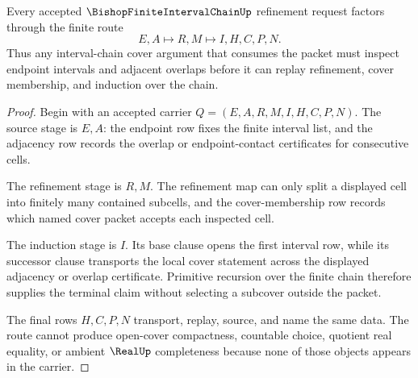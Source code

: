 \begin{theorem}
\label{thm:bishop-finite-interval-chain-refinement-induction}
Every accepted $\BishopFiniteIntervalChainUp$ refinement request factors through the finite route
$$
E,A \longmapsto R,M \longmapsto I,H,C,P,N .
$$
Thus any interval-chain cover argument that consumes the packet must inspect endpoint intervals and adjacent overlaps before it can replay refinement, cover membership, and induction over the chain.
\end{theorem}
\begin{proof}
Begin with an accepted carrier $Q=(E,A,R,M,I,H,C,P,N)$. The source stage is $E,A$: the endpoint row fixes the finite interval list, and the adjacency row records the overlap or endpoint-contact certificates for consecutive cells.

The refinement stage is $R,M$. The refinement map can only split a displayed cell into finitely many contained subcells, and the cover-membership row records which named cover packet accepts each inspected cell.

The induction stage is $I$. Its base clause opens the first interval row, while its successor clause transports the local cover statement across the displayed adjacency or overlap certificate. Primitive recursion over the finite chain therefore supplies the terminal claim without selecting a subcover outside the packet.

The final rows $H,C,P,N$ transport, replay, source, and name the same data. The route cannot produce open-cover compactness, countable choice, quotient real equality, or ambient $\RealUp$ completeness because none of those objects appears in the carrier.
\end{proof}


\begin{closurestatus}{\BishopFiniteIntervalChainUp}
  \theoryclosure{\seedClosure}
  \formalstatus{\unformalizedV}
\end{closurestatus}
